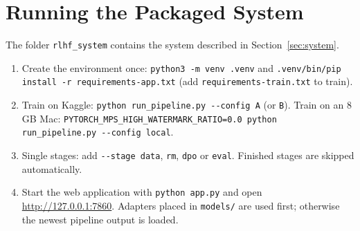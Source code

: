 \section{Running the Packaged System}
The folder \texttt{rlhf\_system} contains the system described in Section~\ref{sec:system}.
\begin{enumerate}
  \item Create the environment once: \texttt{python3 -m venv .venv} and \texttt{.venv/bin/pip install -r requirements-app.txt} (add \texttt{requirements-train.txt} to train).
  \item Train on Kaggle: \texttt{python run\_pipeline.py -{}-config A} (or \texttt{B}). Train on an 8\,GB Mac: \texttt{PYTORCH\_MPS\_HIGH\_WATERMARK\_RATIO=0.0 python run\_pipeline.py -{}-config local}.
  \item Single stages: add \texttt{-{}-stage data}, \texttt{rm}, \texttt{dpo} or \texttt{eval}. Finished stages are skipped automatically.
  \item Start the web application with \texttt{python app.py} and open \url{http://127.0.0.1:7860}. Adapters placed in \texttt{models/} are used first; otherwise the newest pipeline output is loaded.
\end{enumerate}
